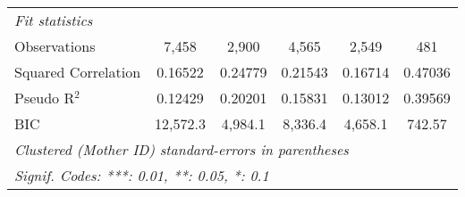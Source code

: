 \documentclass{article}
\begin{document}
\begin{landscape}
\begin{tabular}{lccccc}
   \midrule
   \emph{Fit statistics}\\
   Observations         & 7,458                  & 2,900           & 4,565          & 2,549          & 481\\  
   Squared Correlation  & 0.16522                & 0.24779         & 0.21543        & 0.16714        & 0.47036\\  
   Pseudo R$^2$         & 0.12429                & 0.20201         & 0.15831        & 0.13012        & 0.39569\\  
   BIC                  & 12,572.3               & 4,984.1         & 8,336.4        & 4,658.1        & 742.57\\  
   \midrule \midrule
   \multicolumn{6}{l}{\emph{Clustered (Mother ID) standard-errors in parentheses}}\\
   \multicolumn{6}{l}{\emph{Signif. Codes: ***: 0.01, **: 0.05, *: 0.1}}\\
\end{tabular}
\par\endgroup


\end{landscape}
\end{document}
